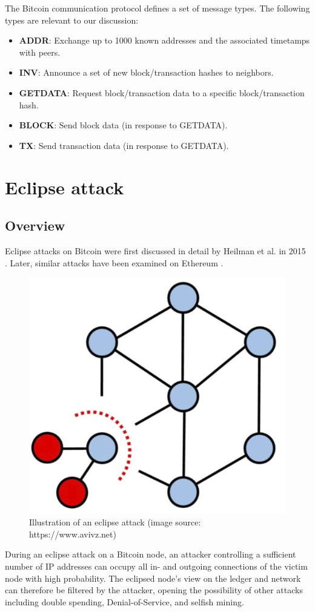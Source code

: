 \documentclass[12pt]{article}
\begin{document}
The Bitcoin communication protocol defines a set of message types. The following types are relevant to our discussion:

\begin{itemize}
    \item \textbf{ADDR}: Exchange up to 1000 known addresses and the associated timetamps with peers.
    \item \textbf{INV}: Announce a set of new block/transaction hashes to neighbors.
    \item \textbf{GETDATA}: Request block/transaction data to a specific block/transaction hash.
    \item \textbf{BLOCK}: Send block data (in response to GETDATA).
    \item \textbf{TX}: Send transaction data (in response to GETDATA).
\end{itemize}

\section{Eclipse attack}
\label{sec:eclipse}

\subsection{Overview}

Eclipse attacks on Bitcoin were first discussed in detail by Heilman et al. in 2015 \cite{Heilman2015EclipseAO}. Later, similar attacks have been examined on Ethereum \cite{EthereumEclipse}.

\begin{figure}[h!]
\centering
\includegraphics[width=0.4\columnwidth]{images/eclipse.png}
\caption{Illustration of an eclipse attack (image source: https://www.avivz.net)}
\label{fig:eclipse}
\end{figure}

During an eclipse attack on a Bitcoin node, an attacker controlling a sufficient number of IP addresses can occupy all in- and outgoing connections of the victim node with high probability. The eclipsed node's view on the ledger and network can therefore be filtered by the attacker, opening the possibility of other attacks including double spending, Denial-of-Service, and selfish mining.
\end{document}
